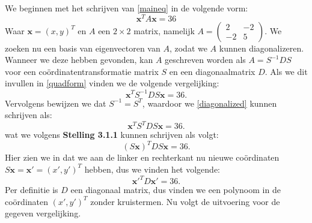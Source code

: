 \documentclass[12pt, dutch, a4paper]{article}
\theoremstyle{definition}
\begin{document}
\begin{enumerate}
    We beginnen met het schrijven van \cref{maineq} in de volgende vorm:
    \begin{equation}\label{quadform}
        \mathbf{x}^T A \mathbf{x} = 36
    \end{equation}
    Waar $\mathbf{x} = (x, y)^T$ en $A$ een $2\times 2$ matrix, namelijk 
    $A = \begin{pmatrix}
        2 & -2 \\
        -2 & 5
    \end{pmatrix}$. We zoeken nu een basis van eigenvectoren van $A$, zodat we $A$ kunnen diagonalizeren. Wanneer we deze hebben gevonden, kan $A$ geschreven worden als $A = S^{-1} D S$ voor een coördinatentransformatie matrix $S$ en een diagonaalmatrix $D$. Als we dit invullen in \cref{quadform} vinden we de volgende vergelijking: 
    \begin{equation}\label{diagonalized}
        \mathbf{x}^T S^{-1} D S \mathbf{x} = 36.
    \end{equation} 
    Vervolgens bewijzen we dat $S^{-1} = S^T$, waardoor we \cref{diagonalized} kunnen schrijven als:
    \begin{equation}
        \mathbf{x}^T S^T D S \mathbf{x} = 36.
    \end{equation} 
    wat we volgens \textbf{Stelling 3.1.1} kunnen schrijven als volgt:
    \begin{equation}
        (S \mathbf{x})^T D S \mathbf{x} = 36.
    \end{equation}
    Hier zien we in dat we aan de linker en rechterkant nu nieuwe coördinaten $S\mathbf{x} = \mathbf{x'} = (x', y')^T$ hebben, dus we vinden het volgende:
    \begin{equation} \label{transed_eq}
        \mathbf{x'}^T D \mathbf{x'} = 36.
    \end{equation}
    Per definitie is $D$ een diagonaal matrix, dus vinden we een polynoom in de coördinaten $(x', y')^T$ zonder kruistermen. Nu volgt de uitvoering voor de gegeven vergelijking.


\end{enumerate}
\end{document}
